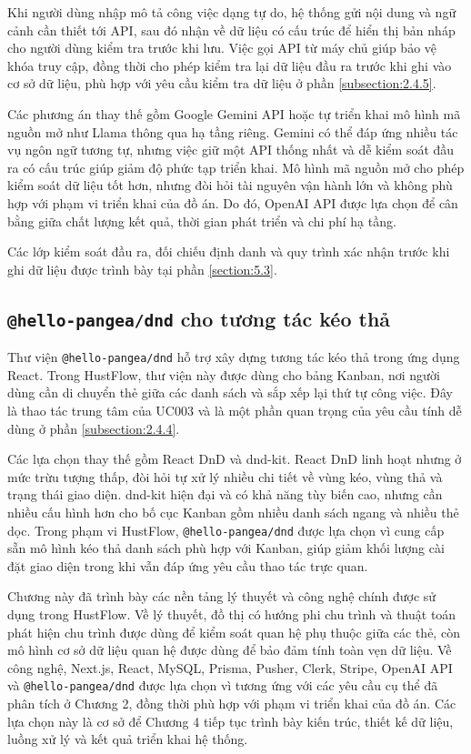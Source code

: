 \documentclass[../DoAn.tex]{subfiles}
\begin{document}
Khi người dùng nhập mô tả công việc dạng tự do, hệ thống gửi nội dung và ngữ cảnh cần thiết tới API, sau đó nhận về dữ liệu có cấu trúc để hiển thị bản nháp cho người dùng kiểm tra trước khi lưu. Việc gọi API từ máy chủ giúp bảo vệ khóa truy cập, đồng thời cho phép kiểm tra lại dữ liệu đầu ra trước khi ghi vào cơ sở dữ liệu, phù hợp với yêu cầu kiểm tra dữ liệu ở phần \ref{subsection:2.4.5}.

Các phương án thay thế gồm Google Gemini API hoặc tự triển khai mô hình mã nguồn mở như Llama thông qua hạ tầng riêng. Gemini có thể đáp ứng nhiều tác vụ ngôn ngữ tương tự, nhưng việc giữ một API thống nhất và dễ kiểm soát đầu ra có cấu trúc giúp giảm độ phức tạp triển khai. Mô hình mã nguồn mở cho phép kiểm soát dữ liệu tốt hơn, nhưng đòi hỏi tài nguyên vận hành lớn và không phù hợp với phạm vi triển khai của đồ án. Do đó, OpenAI API được lựa chọn để cân bằng giữa chất lượng kết quả, thời gian phát triển và chi phí hạ tầng.

Các lớp kiểm soát đầu ra, đối chiếu định danh và quy trình xác nhận trước khi ghi dữ liệu được trình bày tại phần \ref{section:5.3}.

\subsection{\texttt{@hello-pangea/dnd} cho tương tác kéo thả}
\label{subsection:3.2.7}

Thư viện \texttt{@hello-pangea/dnd} \cite{hellopangeadnd} hỗ trợ xây dựng tương tác kéo thả trong ứng dụng React. Trong HustFlow, thư viện này được dùng cho bảng Kanban, nơi người dùng cần di chuyển thẻ giữa các danh sách và sắp xếp lại thứ tự công việc. Đây là thao tác trung tâm của UC003 và là một phần quan trọng của yêu cầu tính dễ dùng ở phần \ref{subsection:2.4.4}.

Các lựa chọn thay thế gồm React DnD và dnd-kit. React DnD linh hoạt nhưng ở mức trừu tượng thấp, đòi hỏi tự xử lý nhiều chi tiết về vùng kéo, vùng thả và trạng thái giao diện. dnd-kit hiện đại và có khả năng tùy biến cao, nhưng cần nhiều cấu hình hơn cho bố cục Kanban gồm nhiều danh sách ngang và nhiều thẻ dọc. Trong phạm vi HustFlow, \texttt{@hello-pangea/dnd} được lựa chọn vì cung cấp sẵn mô hình kéo thả danh sách phù hợp với Kanban, giúp giảm khối lượng cài đặt giao diện trong khi vẫn đáp ứng yêu cầu thao tác trực quan.


Chương này đã trình bày các nền tảng lý thuyết và công nghệ chính được sử dụng trong HustFlow. Về lý thuyết, đồ thị có hướng phi chu trình và thuật toán phát hiện chu trình được dùng để kiểm soát quan hệ phụ thuộc giữa các thẻ, còn mô hình cơ sở dữ liệu quan hệ được dùng để bảo đảm tính toàn vẹn dữ liệu. Về công nghệ, Next.js, React, MySQL, Prisma, Pusher, Clerk, Stripe, OpenAI API và \texttt{@hello-pangea/dnd} được lựa chọn vì tương ứng với các yêu cầu cụ thể đã phân tích ở Chương 2, đồng thời phù hợp với phạm vi triển khai của đồ án. Các lựa chọn này là cơ sở để Chương 4 tiếp tục trình bày kiến trúc, thiết kế dữ liệu, luồng xử lý và kết quả triển khai hệ thống.
\end{document}
